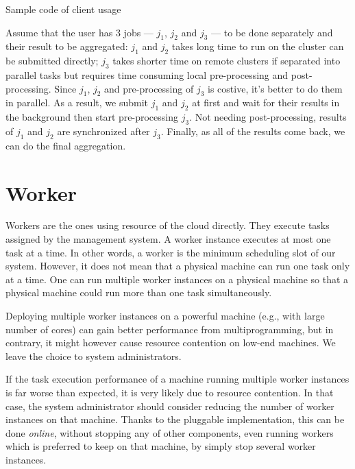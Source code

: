 \begin{Example Code}
  
  \caption{Sample code of client usage}
\end{Example Code}

Assume that the user has 3 jobs --- $j_1$, $j_2$ and $j_3$ --- to be
done separately and their result to be aggregated:  $j_1$ and $j_2$
takes long time to run on the cluster can be submitted directly; $j_3$
takes shorter time on remote clusters if separated into parallel tasks
but requires time consuming local pre-processing and post-processing.
Since $j_1$, $j_2$ and pre-processing of $j_3$ is costive, it's better
to do them in parallel.
As a result, we submit $j_1$ and $j_2$ at first and wait for their
results in the background then start pre-processing $j_3$. Not needing
post-processing, results of $j_1$ and $j_2$ are synchronized after
$j_3$.
Finally, as all of the results come back, we can do the final
aggregation.

\section{Worker}

Workers are the ones using resource of the cloud directly.
They execute tasks assigned by the management system.
A worker instance executes at most one task at a time.
In other words, a worker is the minimum scheduling slot of our system.
However, it does not mean that a physical machine can run one task only
at a time.
One can run multiple worker instances on a physical machine so that a
physical machine could run more than one task simultaneously.

Deploying multiple worker instances on a powerful machine (e.g., with
large number of cores) can gain better performance from
multiprogramming, but in contrary, it might however cause resource
contention on low-end machines.
We leave the choice to system administrators.

If the task execution performance of a machine running multiple worker
instances is far worse than expected, it is very likely due to resource
contention.
In that case, the system administrator should consider reducing the
number of worker instances on that machine.
Thanks to the pluggable implementation, this can be done \emph{online},
without stopping any of other components, even running workers which is
preferred to keep on that machine, by simply stop several worker
instances.

